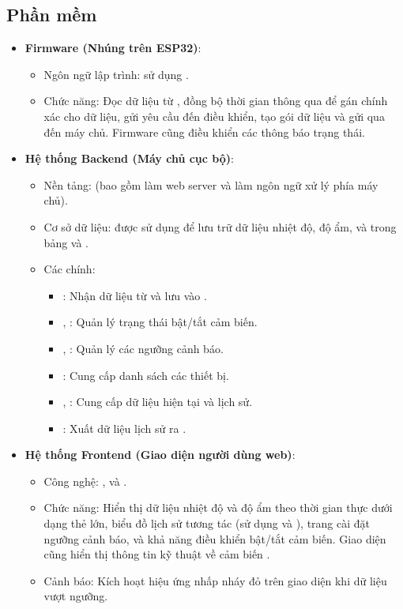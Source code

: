 \subsection{Phần mềm}
\begin{itemize}
	\item \textbf{Firmware (Nhúng trên ESP32)}:
	\begin{itemize}
		\item Ngôn ngữ lập trình:  sử dụng .
		\item Chức năng: Đọc dữ liệu từ , đồng bộ thời gian thông qua  để gán  chính xác cho dữ liệu, gửi yêu cầu  đến  điều khiển, tạo gói dữ liệu  và gửi qua  đến máy chủ. Firmware cũng điều khiển các  thông báo trạng thái.
	\end{itemize}
	\item \textbf{Hệ thống Backend (Máy chủ cục bộ)}:
	\begin{itemize}
		\item Nền tảng:  (bao gồm  làm web server và  làm ngôn ngữ xử lý phía máy chủ).
		\item Cơ sở dữ liệu:  được sử dụng để lưu trữ dữ liệu nhiệt độ, độ ẩm,  và  trong bảng  và .
		\item Các  chính:
		\begin{itemize}
			\item {}: Nhận dữ liệu  từ  và lưu vào .
			\item {}, : Quản lý trạng thái bật/tắt cảm biến.
			\item {}, : Quản lý các ngưỡng cảnh báo.
			\item {}: Cung cấp danh sách các thiết bị.
			\item {}, : Cung cấp dữ liệu hiện tại và lịch sử.
			\item {}: Xuất dữ liệu lịch sử ra .
		\end{itemize}
	\end{itemize}
	\item \textbf{Hệ thống Frontend (Giao diện người dùng web)}:
	\begin{itemize}
		\item Công nghệ: ,  và .
		\item Chức năng: Hiển thị dữ liệu nhiệt độ và độ ẩm theo thời gian thực dưới dạng thẻ lớn, biểu đồ lịch sử tương tác (sử dụng  và ), trang cài đặt ngưỡng cảnh báo, và khả năng điều khiển bật/tắt cảm biến. Giao diện cũng hiển thị thông tin kỹ thuật về cảm biến .
		\item Cảnh báo: Kích hoạt hiệu ứng nhấp nháy đỏ trên giao diện khi dữ liệu vượt ngưỡng.
	\end{itemize}
\end{itemize}